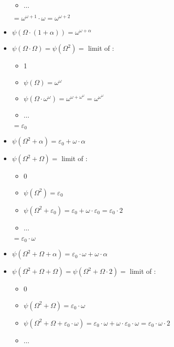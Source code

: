 \documentclass[10pt]{article}
\begin{document}
\begin{itemize}
\begin{itemize}
   \item \( \ldots \)
   \end{itemize}
   \( = \omega^{\omega+1} \cdot \omega = \omega^{\omega+2} \)
\item \( \psi(\Omega \cdot (1+\alpha)) = \omega^{\omega+\alpha} \)
\item \( \psi(\Omega \cdot \Omega) = \psi(\Omega^2) = \) limit of :
   \begin{itemize}
     \setlength{\itemsep}{1pt}
     \setlength{\parskip}{0pt}
     \setlength{\parsep}{0pt}
   \item 1
   \item \( \psi(\Omega) = \omega^\omega \)
   \item \( \psi(\Omega \cdot \omega^\omega) = \omega^{\omega+\omega^\omega} = \omega^{\omega^\omega} \)
   \item \( \ldots \)
   \end{itemize} 
   \( = \varepsilon_0 \)
\item \( \psi(\Omega^2+\alpha) = \varepsilon_0+\omega \cdot \alpha \)
\item \( \psi(\Omega^2 + \Omega) = \) limit of :
   \begin{itemize}
     \setlength{\itemsep}{1pt}
     \setlength{\parskip}{0pt}
     \setlength{\parsep}{0pt}
   \item 0
   \item \( \psi(\Omega^2) = \varepsilon_0 \)
   \item \( \psi(\Omega^2+\varepsilon_0) = \varepsilon_0+\omega \cdot \varepsilon_0 = \varepsilon_0 \cdot 2 \)
   \item \( \ldots \)
   \end{itemize}
   \( = \varepsilon_0 \cdot \omega \)
\item \( \psi(\Omega^2+\Omega+\alpha) = \varepsilon_0 \cdot \omega + \omega \cdot \alpha \)
\item \( \psi(\Omega^2+\Omega+\Omega) = \psi(\Omega^2+\Omega \cdot 2) = \) limit of :
   \begin{itemize}
     \setlength{\itemsep}{1pt}
     \setlength{\parskip}{0pt}
     \setlength{\parsep}{0pt}
   \item 0
   \item \( \psi(\Omega^2+\Omega) = \varepsilon_0 \cdot \omega \)
   \item \( \psi(\Omega^2+\Omega+\varepsilon_0 \cdot \omega) = \varepsilon_0 \cdot \omega + \omega \cdot \varepsilon_0 \cdot \omega = \varepsilon_0 \cdot \omega \cdot 2 \)
   \item \( \ldots \)

\end{itemize}
\end{itemize}
\end{document}
